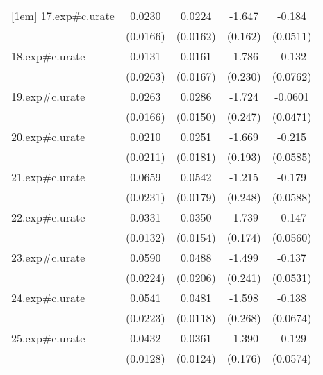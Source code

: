 {\begin{tabular}{l*{4}{c}}
[1em]
17.exp#c.urate&      0.0230         &      0.0224         &      -1.647\sym{***}&      -0.184\sym{***}\\
            &    (0.0166)         &    (0.0162)         &     (0.162)         &    (0.0511)         \\
[1em]
18.exp#c.urate&      0.0131         &      0.0161         &      -1.786\sym{***}&      -0.132         \\
            &    (0.0263)         &    (0.0167)         &     (0.230)         &    (0.0762)         \\
[1em]
19.exp#c.urate&      0.0263         &      0.0286         &      -1.724\sym{***}&     -0.0601         \\
            &    (0.0166)         &    (0.0150)         &     (0.247)         &    (0.0471)         \\
[1em]
20.exp#c.urate&      0.0210         &      0.0251         &      -1.669\sym{***}&      -0.215\sym{***}\\
            &    (0.0211)         &    (0.0181)         &     (0.193)         &    (0.0585)         \\
[1em]
21.exp#c.urate&      0.0659\sym{**} &      0.0542\sym{**} &      -1.215\sym{***}&      -0.179\sym{**} \\
            &    (0.0231)         &    (0.0179)         &     (0.248)         &    (0.0588)         \\
[1em]
22.exp#c.urate&      0.0331\sym{*}  &      0.0350\sym{*}  &      -1.739\sym{***}&      -0.147\sym{*}  \\
            &    (0.0132)         &    (0.0154)         &     (0.174)         &    (0.0560)         \\
[1em]
23.exp#c.urate&      0.0590\sym{*}  &      0.0488\sym{*}  &      -1.499\sym{***}&      -0.137\sym{*}  \\
            &    (0.0224)         &    (0.0206)         &     (0.241)         &    (0.0531)         \\
[1em]
24.exp#c.urate&      0.0541\sym{*}  &      0.0481\sym{***}&      -1.598\sym{***}&      -0.138\sym{*}  \\
            &    (0.0223)         &    (0.0118)         &     (0.268)         &    (0.0674)         \\
[1em]
25.exp#c.urate&      0.0432\sym{**} &      0.0361\sym{**} &      -1.390\sym{***}&      -0.129\sym{*}  \\
            &    (0.0128)         &    (0.0124)         &     (0.176)         &    (0.0574)         \\

\end{tabular}}
